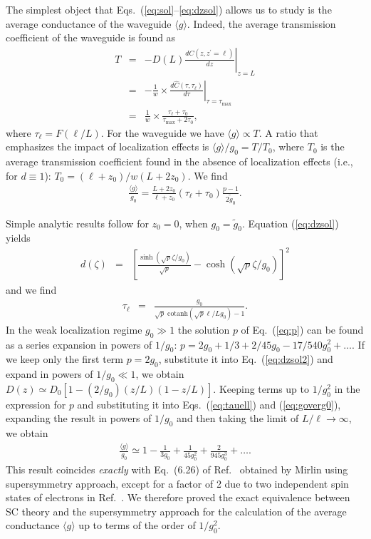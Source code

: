 The simplest object that Eqs.\ (\ref{eq:sol}--\ref{eq:dzsol}) allows us to study is the average conductance of the waveguide $\langle g \rangle$. Indeed, the average transmission coefficient of the waveguide is found as
\begin{eqnarray}
T &=& -D(L) \left. \frac{dC(z, z^{\prime}=\ell)}{dz} \right|_{z=L}
\nonumber \\
&=& - \frac{1}{w} \times \left.
\frac{d{\hat C}(\tau, \tau_{\ell})}{d\tau}
\right|_{\tau = \tau_{\mathrm{max}}}
\nonumber \\
&=& \frac{1}{w} \times \frac{\tau_{\ell} + \tau_0}{\tau_{\mathrm{max}} + 2 \tau_0},
\label{eq:t}
\end{eqnarray}
where $\tau_{\ell} = F(\ell/L)$.
For the waveguide we have $\langle g \rangle \propto T$. A ratio that emphasizes the impact of localization effects is $\langle g \rangle/g_0 = T/T_0$, where $T_0$ is the average transmission coefficient found in the absence of localization effects (i.e., for $d \equiv 1$): $T_0 = (\ell + z_0)/w(L + 2 z_0)$. We find
\begin{eqnarray}
\frac{\langle g \rangle}{g_0} =
\frac{L + 2 z_0}{\ell + z_0}
(\tau_{\ell} + \tau_0)
\frac{p - 1}{2 {\tilde g}_0}.
\label{eq:goverg0}
\end{eqnarray}

Simple analytic results follow for $z_0 = 0$, when $g_0 = {\tilde g}_0$. Equation (\ref{eq:dzsol}) yields
\begin{eqnarray}
d(\zeta) &=& \left[ \frac{\sinh(\sqrt{p} \zeta/g_0)}{\sqrt{p}} - \cosh(\sqrt{p} \zeta/g_0) \right]^2
\label{eq:dzsol2}
\end{eqnarray}
and we find
\begin{eqnarray}
\tau_{\ell} &=& \frac{g_0}{\sqrt{p}\; \mathrm{cotanh}
(\sqrt{p} \ell/L g_0) -1}.
\label{eq:tauell}
\end{eqnarray}
In the weak localization regime $g_0 \gg 1$ the solution $p$ of Eq.~(\ref{eq:p}) can be found as a series expansion in powers of $1/g_0$:
$p = 2 g_0 + 1/3 + 2/45 g_0 - 17/540 g_0^2 + \ldots$.
If we keep only the first term $p = 2 g_0$, substitute it into Eq.~(\ref{eq:dzsol2}) and expand in powers of $1/g_0 \ll 1$, we obtain
$D(z) \simeq D_0 [ 1 - (2/g_0) (z/L)(1-z/L)]$.
Keeping terms up to $1/g_0^2$ in the expression for $p$ and substituting it into Eqs.\ (\ref{eq:tauell}) and (\ref{eq:goverg0}), expanding the result in powers of $1/g_0$ and then taking the limit of $L/\ell \rightarrow \infty$, we obtain
\begin{eqnarray}
\frac{\langle g \rangle}{g_0} \simeq
1 - \frac{1}{3 g_0} + \frac{1}{45 g_0^2} + \frac{2}{945 g_0^3} + \ldots.
\label{eq:goverg01}
\end{eqnarray}
This result coincides {\em exactly} with Eq.~(6.26) of Ref.~\cite{2000_Mirlin} obtained by Mirlin using supersymmetry approach, except for a factor of 2 due to two independent spin states of electrons in Ref.~\cite{2000_Mirlin}. We therefore proved the exact equivalence between SC theory and the supersymmetry approach for the calculation of the average conductance $\langle g \rangle$ up to terms of the order of $1/g_0^2$.

